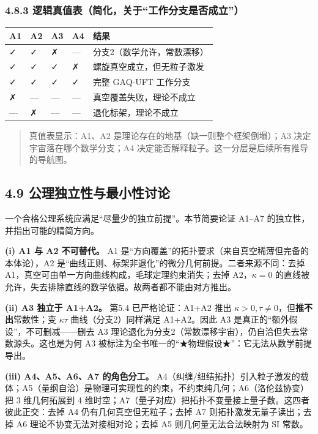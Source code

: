 \subsubsection{4.8.3
逻辑真值表（简化，关于``工作分支是否成立''）}\label{ux903bux8f91ux771fux503cux8868ux7b80ux5316ux5173ux4e8eux5de5ux4f5cux5206ux652fux662fux5426ux6210ux7acb}

\begin{longtable}[]{@{}lllll@{}}
\toprule\noalign{}
A1 & A2 & A3 & A4 & 结果 \\
\midrule\noalign{}
\endhead
\bottomrule\noalign{}
\endlastfoot
✓ & ✓ & ✗ & --- & 分支2（数学允许，常数漂移） \\
✓ & ✓ & ✓ & ✗ & 螺旋真空成立，但无粒子激发 \\
✓ & ✓ & ✓ & ✓ & 完整 GAQ‑UFT 工作分支 \\
✗ & --- & --- & --- & 真空覆盖失败，理论不成立 \\
--- & ✗ & --- & --- & 退化标架，理论不成立 \\
\end{longtable}

\begin{quote}
真值表显示：A1、A2 是理论存在的地基（缺一则整个框架倒塌）；A3
决定宇宙落在哪个数学分支；A4
决定能否解释粒子。这一分层是后续所有推导的导航图。
\end{quote}

\subsection{4.9
公理独立性与最小性讨论}\label{ux516cux7406ux72ecux7acbux6027ux4e0eux6700ux5c0fux6027ux8ba8ux8bba}

一个合格公理系统应满足``尽量少的独立前提''。本节简要论证 A1--A7
的独立性，并指出可能的精简方向。

\textbf{(i) A1 与 A2 不可替代。} A1
是``方向覆盖''的拓扑要求（来自真空稀薄但完备的本体论），A2
是``曲线正则、标架非退化''的微分几何前提。二者来源不同：去掉
A1，真空可由单一方向曲线构成，毛球定理约束消失；去掉 A2，\(\kappa=0\)
的直线被允许，失去排除直线的数学依据。故两者都不能由对方推出。

\textbf{(ii) A3 独立于 A1+A2。} 第5.4 已严格论证：A1+A2 推出
\(\kappa>0,\tau\neq0\)，但\textbf{推不出}常数性；变 \(\kappa\tau\)
曲线（分支2）同样满足 A1+A2。因此 A3
是真正的``额外假设''，不可删减------删去 A3
理论退化为分支2（常数漂移宇宙），仍自洽但失去常数源头。这也是为何 A3
被标注为全书唯一的``★物理假设★''：它无法从数学前提导出。

\textbf{(iii) A4、A5、A6、A7 的角色分工。}
A4（纠缠/纽结拓扑）引入粒子激发的载体；A5（量纲自洽）是物理可实现性的约束，不约束纯几何；A6（洛伦兹协变）把
3 维几何拓展到 4
维时空；A7（量子对应）把拓扑不变量接上量子数。这四者彼此正交：去掉 A4
仍有几何真空但无粒子；去掉 A7 则拓扑激发无量子读出；去掉 A6
理论不协变无法对接相对论；去掉 A5 则几何量无法合法映射为 SI 常数。

